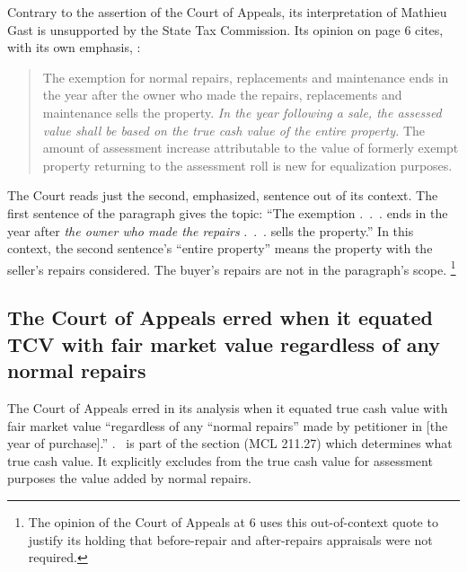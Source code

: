 \documentclass[12pt,\documentclassflag]{michiganCourtOfAppealsBrief}
\begin{document}
Contrary to the assertion of the Court of Appeals, its interpretation of Mathieu Gast is unsupported by the State Tax Commission. Its opinion on page 6 cites, with its own emphasis, :

\begin{quote}
The exemption for normal repairs, replacements and maintenance ends in the year after the
owner who made the repairs, replacements and maintenance sells the property. \emph{In the year
following a sale, the assessed value shall be based on the true cash value of the entire property.}
The amount of assessment increase attributable to the value of formerly exempt property
returning to the assessment roll is new for equalization purposes.
\end{quote}

The Court reads just the second, emphasized, sentence out of its context. The first sentence of the paragraph gives the topic: ``The exemption .~.~. ends in the year after \emph{the owner who made the repairs} .~.~. sells the property.'' In this context, the second sentence's ``entire property'' means the property with the seller's repairs considered.
The buyer's repairs are not in the paragraph's scope.%
\footnote{The opinion of the Court of Appeals at 6 uses this out-of-context quote to justify its holding that before-repair and after-repairs appraisals were not required.}

\subsection{The Court of Appeals erred when it equated TCV with fair market value regardless of any normal repairs}

The Court of Appeals erred in its analysis when it equated true cash value with fair market value ``regardless of any ``normal repairs'' made by petitioner in [the year of purchase].'' . \mathieuGast\ is part of the section (MCL 211.27) which  determines what true cash value. It explicitly excludes from the true cash value for assessment purposes the value added by normal repairs.
  
\end{document}

